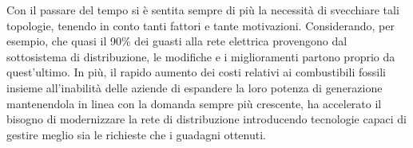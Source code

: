 Con il passare del tempo si è sentita sempre di più la necessità di svecchiare tali topologie, tenendo in conto tanti fattori e tante motivazioni.\newline
Considerando, per esempio, che quasi il 90\% dei guasti alla rete elettrica provengono dal sottosistema di distribuzione, le modifiche e i miglioramenti partono proprio da quest'ultimo. In più, il rapido aumento dei costi relativi ai combustibili fossili insieme all'inabilità delle aziende di espandere la loro potenza di generazione mantenendola in linea con la domanda sempre più crescente, ha accelerato il bisogno di modernizzare la rete di distribuzione introducendo tecnologie capaci di gestire meglio sia le richieste che i guadagni ottenuti. \newline
\begin{figure}[h]
\end{figure}

